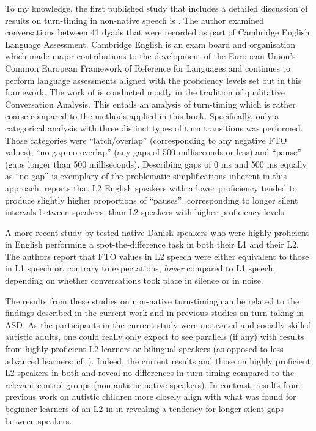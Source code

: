To my knowledge, the first published study that includes a detailed discussion of results on turn-timing in non-native speech is \citet{galacziInteractionalCompetenceProficiency2014}. The author examined conversations between 41 dyads that were recorded as part of Cambridge English Language Assessment. Cambridge English is an exam board and organisation which made major contributions to the development of the European Union's Common European Framework of Reference for Languages \citep{councilofeuropeCommonEuropeanFramework2001} and continues to perform language assessments aligned with the proficiency levels set out in this framework. The work of \citet{galacziInteractionalCompetenceProficiency2014} is conducted mostly in the tradition of qualitative Conversation Analysis. This entails an analysis of turn-timing which is rather coarse compared to the methods applied in this book. Specifically, only a categorical analysis with three distinct types of turn transitions was performed. Those categories were ``latch/overlap'' (corresponding to any negative FTO values), ``no-gap-no-overlap'' (any gaps of 500 milliseconds or less) and ``pause'' (gaps longer than 500 milliseconds). Describing gaps of 0 ms and 500 ms equally as ``no-gap'' is exemplary of the problematic simplifications inherent in this approach. \citet{galacziInteractionalCompetenceProficiency2014} reports that L2 English speakers with a lower proficiency tended to produce slightly higher proportions of ``pauses'', corresponding to longer silent intervals between speakers, than L2 speakers with higher proficiency levels.

A more recent study by \citet{sorensenEffectsNoiseL22019} tested native Danish speakers who were highly proficient in English performing a spot-the-difference task in both their L1 and their L2. The authors report that FTO values in L2 speech were either equivalent to those in L1 speech or, contrary to expectations, \emph{lower} compared to L1 speech, depending on whether conversations took place in silence or in noise.

The results from these studies on non-native turn-timing can be related to the findings described in the current work and in previous studies on turn-taking in ASD. As the participants in the current study were motivated and socially skilled autistic adults, one could really only expect to see parallels (if any) with results from highly proficient L2 learners or bilingual speakers (as opposed to less advanced learners; cf. ). Indeed, the current results and those on highly proficient L2 speakers in both \citet{galacziInteractionalCompetenceProficiency2014} and \citet{sorensenEffectsNoiseL22019} reveal no differences in turn-timing compared to the relevant control groups (non-autistic native speakers). In contrast, results from previous work on autistic children more closely align with what was found for beginner learners of an L2 in \citet{galacziInteractionalCompetenceProficiency2014} in revealing a tendency for longer silent gaps between speakers.


